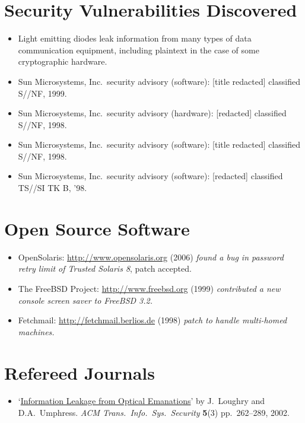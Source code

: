 \documentclass[12pt,twoside,letterpaper]{article}
\begin{document}
\section*{Security Vulnerabilities Discovered}
\vspace{-2mm}
\begin{itemize}
	\item Light emitting diodes leak information from many types of data communication equipment,
		including plaintext in the case of some cryptographic hardware.
    \item Sun Microsystems, Inc.\ security advisory (software): [title redacted] classified S//NF,
		1999.
	\vspace{-2mm}
	\item Sun Microsystems, Inc.\ security advisory (hardware): [redacted] classified S//NF,
		1998.
	\vspace{-2mm}
	\item Sun Microsystems, Inc.\ security advisory (software): [title redacted] classified S//NF,
		1998.
	\vspace{-2mm}
	\item Sun Microsystems, Inc.\ security advisory (software): [redacted] classified TS//SI TK B,
		'98.
\end{itemize}


\section*{Open Source Software}
\vspace{-2mm}
\begin{itemize}
	\item OpenSolaris: \url{http://www.opensolaris.org} (2006) \emph{found a bug in password
		retry limit of Trusted Solaris 8}, patch accepted.
	\item The FreeBSD Project: \url{http://www.freebsd.org} (1999) \emph{contributed a new
		console screen saver to FreeBSD 3.2.}
	\item Fetchmail: \url{http://fetchmail.berlios.de} (1998) \emph{patch to handle multi-homed
		machines.}
\end{itemize}

\vspace{-8mm}
\section*{Refereed Journals}
\vspace{-2mm}
\begin{itemize}
    \item `\href{http://dl.acm.org/citation.cfm?doid=545186.545189}{Information Leakage
	from Optical Emanations}' by J.\ Loughry and D.A.\ Umphress. \emph{ACM
	Trans.\ Info.\ Sys.\ Security} \textbf{5}(3) pp.\ 262--289, 2002.
\end{itemize}
\end{document}
